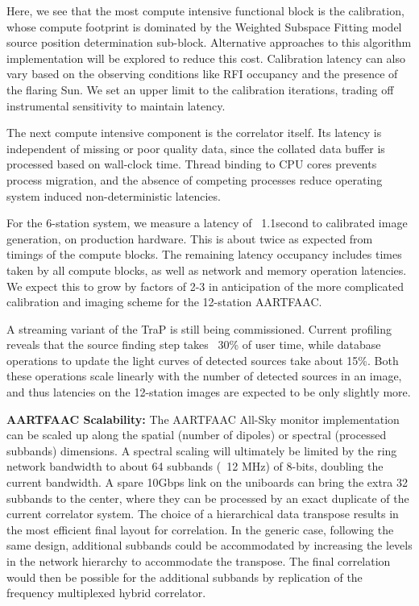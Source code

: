 \documentclass{ws-jai}
\begin{document}
Here,  we  see  that  the  most   compute  intensive  functional  block  is  the
calibration,  whose compute  footprint  is dominated  by  the Weighted  Subspace
Fitting model source position determination sub-block. Alternative approaches to
this algorithm implementation will be  explored to reduce this cost. Calibration
latency can also  vary based on the observing conditions  like RFI occupancy and
the  presence of  the flaring  Sun. We  set an  upper limit  to the  calibration
iterations, trading off instrumental sensitivity to maintain latency.

The next  compute intensive component is  the correlator itself. Its  latency is
independent of missing  or poor quality data, since the  collated data buffer is
processed based on wall-clock time. Thread binding to CPU cores prevents process
migration,  and  the absence  of  competing  processes reduce  operating  system
induced non-deterministic latencies.

For the 6-station system, we measure a latency of ~1.1second to calibrated image
generation, on production hardware. This is about twice as expected from timings
of the compute  blocks. The remaining latency occupancy includes  times taken by
all compute blocks, as well as network and memory operation latencies. We expect
this  to  grow  by factors  of  2-3  in  anticipation  of the  more  complicated
calibration and imaging scheme for the 12-station AARTFAAC.

A streaming variant  of the TraP is still being  commissioned. Current profiling
reveals that  the source finding step  takes ~30\% of user  time, while database
operations to update the light curves  of detected sources take about 15\%. Both
these operations scale linearly with the number of detected sources in an image,
and thus  latencies on the  12-station images are  expected to be  only slightly
more.

\noindent  \textbf   {AARTFAAC  Scalability:}   The  AARTFAAC   All-Sky  monitor
implementation  can be  scaled  up  along the  spatial  (number  of dipoles)  or
spectral (processed subbands) dimensions. A  spectral scaling will ultimately be
limited by the ring network bandwidth to  about 64 subbands (~12 MHz) of 8-bits,
doubling the current  bandwidth. A spare 10Gbps link on  the uniboards can bring
the extra  32 subbands to the  center, where they  can be processed by  an exact
duplicate of the  current correlator system.  The choice of  a hierarchical data
transpose results  in the most efficient  final layout for correlation.   In the
generic  case,  following   the  same  design,  additional   subbands  could  be
accommodated by  increasing the levels  in the network hierarchy  to accommodate
the transpose.  The final correlation would  then be possible for the additional
subbands by replication of the frequency multiplexed hybrid correlator.
\end{document}
